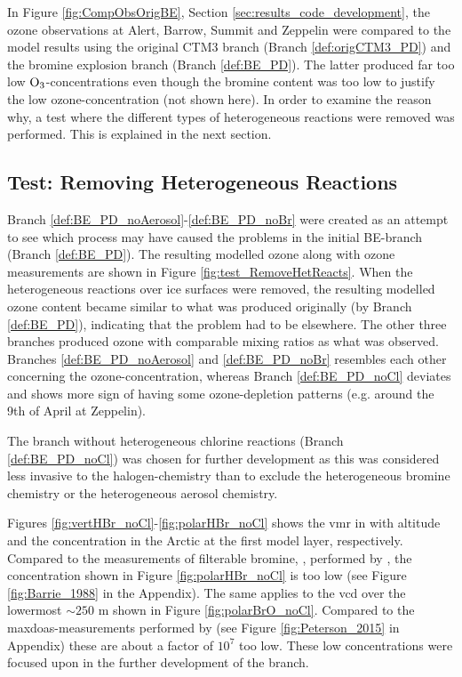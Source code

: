 In Figure \ref{fig:CompObsOrigBE}, Section \ref{sec:results_code_development}, the ozone observations at Alert, Barrow, Summit and Zeppelin were compared to the model results using the original CTM3 branch (Branch \ref{def:origCTM3_PD}) and the bromine explosion branch (Branch \ref{def:BE_PD}). The latter produced far too low $\mathrm{O_3}$-concentrations even though the bromine content was too low to justify the low ozone-concentration (not shown here). In order to examine the reason why, a test where the different types of heterogeneous reactions were removed was performed. This is explained in the next section. 

\subsection{Test: Removing Heterogeneous Reactions}

Branch \ref{def:BE_PD_noAerosol}-\ref{def:BE_PD_noBr} were created as an attempt to see which process may have caused the problems in the initial BE-branch (Branch \ref{def:BE_PD}). The resulting modelled ozone along with ozone measurements are shown in Figure \ref{fig:test_RemoveHetReacts}. When the heterogeneous reactions over ice surfaces were removed, the resulting modelled ozone content became similar to what was produced originally (by Branch \ref{def:BE_PD}), indicating that the problem had to be elsewhere. The other three branches produced ozone with comparable mixing ratios as what was observed. Branches \ref{def:BE_PD_noAerosol} and \ref{def:BE_PD_noBr} resembles each other concerning the ozone-concentration, whereas Branch \ref{def:BE_PD_noCl} deviates and shows more sign of having some ozone-depletion patterns (e.g. around the 9th of April at Zeppelin). 

\medskip

The branch without heterogeneous chlorine reactions (Branch \ref{def:BE_PD_noCl}) was chosen for further development as this was considered less invasive to the halogen-chemistry than to exclude the heterogeneous bromine chemistry or the heterogeneous aerosol chemistry. 

\medskip

Figures \ref{fig:vertHBr_noCl}-\ref{fig:polarHBr_noCl} shows the \acrlong{vmr} in with altitude and the concentration in the Arctic at the first model layer, respectively. Compared to the measurements of filterable bromine, , performed by \cite{barrie}, the concentration shown in Figure \ref{fig:polarHBr_noCl} is too low (see Figure \ref{fig:Barrie_1988} in the Appendix). The same applies to the  \acrshort{vcd} over the lowermost $\sim 250$ m shown in Figure \ref{fig:polarBrO_noCl}. Compared to the \acrshort{maxdoas}-measurements performed by \cite{Peterson2015} (see Figure \ref{fig:Peterson_2015} in Appendix) these are about a factor of $10^7$ too low. These low concentrations were focused upon in the further development of the branch. 



